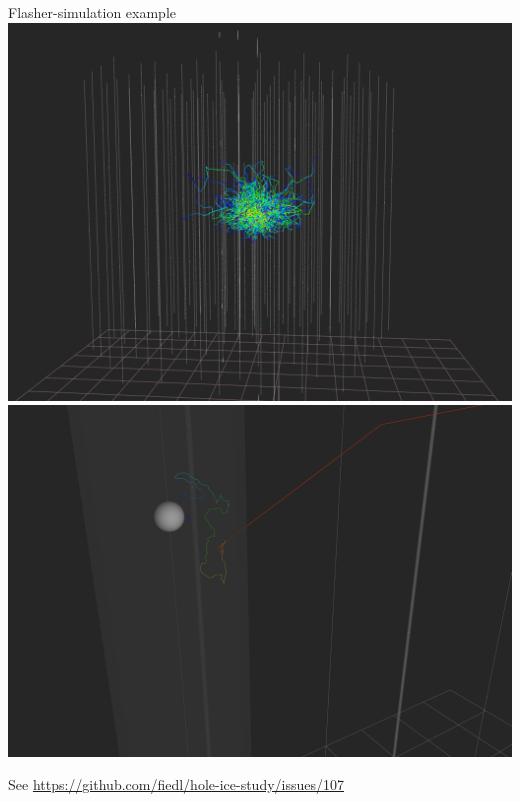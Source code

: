 \begin{frame}{Flasher-simulation example}
  \includegraphics[height=0.4\textheight]{img/flasher-steamshovel-total}\hspace{3mm}
  \includegraphics[height=0.4\textheight]{img/flasher-steamshovel-single-received-photon}

  \tiny{See \url{https://github.com/fiedl/hole-ice-study/issues/107}}

\end{frame}
